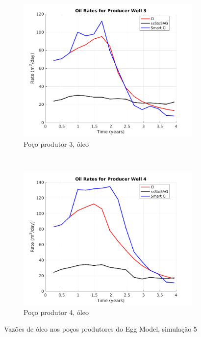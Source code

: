 \begin{figure}[!ht]
	\begin{subfigure}[b]{.3\textwidth}
		\includegraphics[width=\textwidth]{figs/resultadosEgg/imgsim5/EGG_OilWell3_Zoom}
		\caption{Po\c{c}o produtor 3, \'{o}leo}
		\label{EGG5_OilWell3}
	\end{subfigure}
	~
	\begin{subfigure}[b]{.3\textwidth}
		\includegraphics[width=\textwidth]{figs/resultadosEgg/imgsim5/EGG_OilWell4_Zoom}
		\caption{Po\c{c}o produtor 4, \'{o}leo}
		\label{EGG5_OilWell4}
	\end{subfigure}
	\caption{Vaz\~{o}es de \'{o}leo nos po\c{c}os produtores do Egg Model, simula\c{c}\~{a}o 5}
	\label{EGG5_OilRates}
\end{figure}

